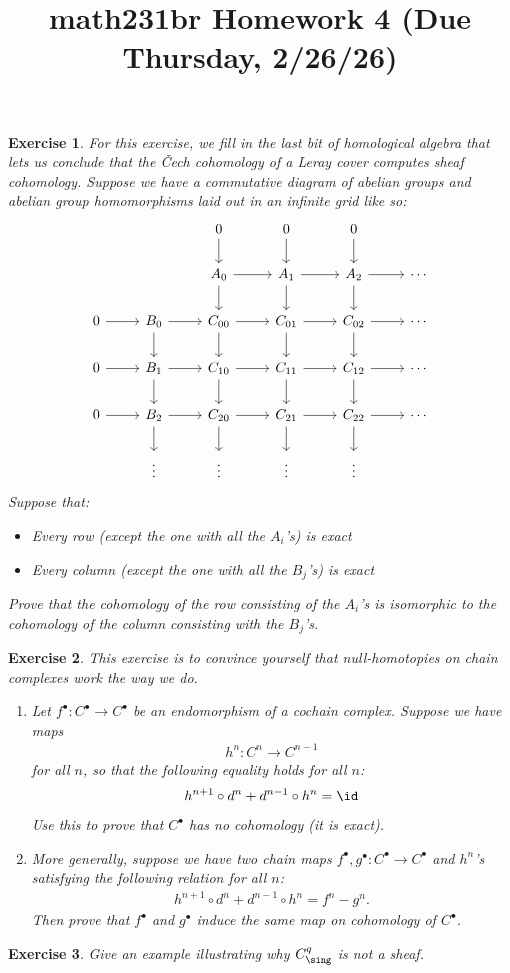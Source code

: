 \documentclass[11pt]{amsart}
\title{math231br Homework 4 (Due Thursday, 2/26/26)}
\newtheorem{hwexercise}{Exercise}
\begin{document}
\maketitle

\begin{hwexercise} For this exercise, we fill in the last bit of homological algebra that lets us conclude that the \v{C}ech cohomology of a Leray cover computes sheaf cohomology. Suppose we have a commutative diagram of abelian groups and abelian group homomorphisms laid out in an infinite grid like so:
\[ \begin{tikzcd}
     &  & 0\dar & 0\dar & 0\dar & \\
     &  & A_0\rar\dar & A_1\rar\dar & A_2\rar\dar & \cdots\\
    0\rar & B_0\rar\dar & C_{00}\rar\dar & C_{01}\rar\dar  & C_{02}\rar\dar  & \cdots \\
    0\rar & B_1\rar\dar & C_{10}\rar\dar & C_{11}\rar\dar  & C_{12}\rar\dar  & \cdots \\
    0\rar & B_2\rar\dar & C_{20}\rar\dar & C_{21}\rar\dar  & C_{22}\rar\dar  & \cdots \\
    & \vdots  & \vdots  & \vdots  & \vdots  & 
\end{tikzcd} \]
Suppose that:
\begin{itemize}
    \item Every row (except the one with all the $A_i$'s) is exact
    \item Every column (except the one with all the $B_j$'s) is exact
\end{itemize}
Prove that the cohomology of the row consisting of the $A_i$'s is isomorphic to the cohomology of the column consisting with the $B_j$'s.
\end{hwexercise}

\begin{hwexercise} This exercise is to convince yourself that null-homotopies on chain complexes work the way we do.
\begin{enumerate}
    \item Let $f^\bullet \colon C^\bullet \to C^\bullet$ be an endomorphism of a cochain complex. Suppose we have maps
    \begin{align*}
        h^n \colon C^n \to C^{n-1}
    \end{align*}
    for all $n$, so that the following equality holds for all $n$:
    \begin{align*}
        h^{n+1}\circ d^n + d^{n-1}\circ h^n = \id
    \end{align*}
    Use this to prove that $C^\bullet$ has no cohomology (it is exact).

    \item More generally, suppose we have two chain maps $f^\bullet, g^\bullet \colon C^\bullet \to C^\bullet$ and $h^n$'s satisfying the following relation for all $n$:
    \begin{align*}
        h^{n+1}\circ d^n + d^{n-1}\circ h^n = f^n - g^n.
    \end{align*}
    Then prove that $f^\bullet$ and $g^\bullet$ induce the same map on cohomology of $C^\bullet$.
\end{enumerate}
\end{hwexercise}


\begin{hwexercise} Give an example illustrating why $C^q_\sing$ is not a sheaf.
\end{hwexercise}
\end{document}
